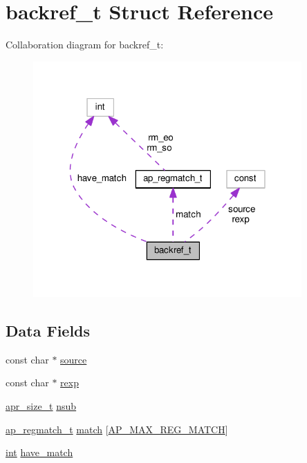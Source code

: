 \hypertarget{structbackref__t}{}\section{backref\+\_\+t Struct Reference}
\label{structbackref__t}


Collaboration diagram for backref\+\_\+t\+:
\nopagebreak
\begin{figure}[H]
\begin{center}
\leavevmode
\includegraphics[width=291pt]{structbackref__t__coll__graph}
\end{center}
\end{figure}
\subsection*{Data Fields}
\begin{DoxyCompactItemize}
\item 
const char $\ast$ \hyperlink{structbackref__t_a387ecd9d4979b9bc806aa9ab1c77d324}{source}
\item 
const char $\ast$ \hyperlink{structbackref__t_a9ac4604612d7a31e60a4ff6a66bfcbc4}{rexp}
\item 
\hyperlink{group__apr__platform_gaaa72b2253f6f3032cefea5712a27540e}{apr\+\_\+size\+\_\+t} \hyperlink{structbackref__t_a9ec7565fa057adbae7cdced896e7051e}{nsub}
\item 
\hyperlink{structap__regmatch__t}{ap\+\_\+regmatch\+\_\+t} \hyperlink{structbackref__t_abec48b8a852220839adaea23854bd24f}{match} \mbox{[}\hyperlink{group__APACHE__CORE__DAEMON_ga7cc324c99d14a68ba7c8d1aae306a8d8}{A\+P\+\_\+\+M\+A\+X\+\_\+\+R\+E\+G\+\_\+\+M\+A\+T\+CH}\mbox{]}
\item 
\hyperlink{pcre_8txt_a42dfa4ff673c82d8efe7144098fbc198}{int} \hyperlink{structbackref__t_a762be7e19f4ae98ed3a90753df97850f}{have\+\_\+match}
\end{DoxyCompactItemize}


